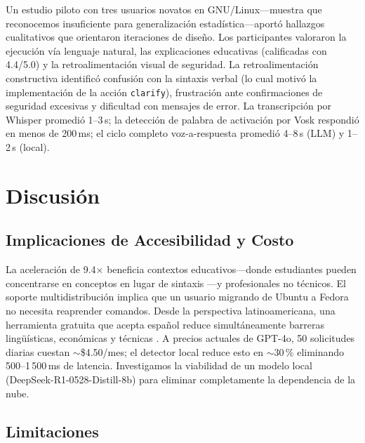 \documentclass[10pt,a4paper]{article}
\begin{document}
Un estudio piloto con tres usuarios novatos en GNU/Linux---muestra que reconocemos insuficiente para generalizaci\'{o}n estad\'{i}stica---aport\'{o} hallazgos cualitativos que orientaron iteraciones de dise\~{n}o. Los participantes valoraron la ejecuci\'{o}n v\'{i}a lenguaje natural, las explicaciones educativas (calificadas con 4.4/5.0) y la retroalimentaci\'{o}n visual de seguridad. La retroalimentaci\'{o}n constructiva identific\'{o} confusi\'{o}n con la sintaxis verbal (lo cual motiv\'{o} la implementaci\'{o}n de la acci\'{o}n \texttt{clarify}), frustraci\'{o}n ante confirmaciones de seguridad excesivas y dificultad con mensajes de error. La transcripci\'{o}n por Whisper promedi\'{o} 1--3\,s; la detecci\'{o}n de palabra de activaci\'{o}n por Vosk respondi\'{o} en menos de 200\,ms; el ciclo completo voz-a-respuesta promedi\'{o} 4--8\,s (LLM) y 1--2\,s (local).


\section{Discusi\'{o}n}
\label{sec:discussion}

\subsection{Implicaciones de Accesibilidad y Costo}
\label{subsec:implications}

La aceleraci\'{o}n de 9.4$\times$ beneficia contextos educativos---donde estudiantes pueden concentrarse en conceptos en lugar de sintaxis \citep{Norman2013}---y profesionales no t\'{e}cnicos. El soporte multidistribuci\'{o}n implica que un usuario migrando de Ubuntu a Fedora no necesita reaprender comandos. Desde la perspectiva latinoamericana, una herramienta gratuita que acepta espa\~{n}ol reduce simult\'{a}neamente barreras ling\"{u}\'{i}sticas, econ\'{o}micas y t\'{e}cnicas \citep{CEPAL2023, Warschauer2004}. A precios actuales de GPT-4o, 50 solicitudes diarias cuestan $\sim$\$4.50/mes; el detector local reduce esto en $\sim$30\,\% eliminando 500--1\,500\,ms de latencia. Investigamos la viabilidad de un modelo local (DeepSeek-R1-0528-Distill-8b) \citep{DeepSeek2025} para eliminar completamente la dependencia de la nube.

\subsection{Limitaciones}
\label{subsec:limitations}
\end{document}
